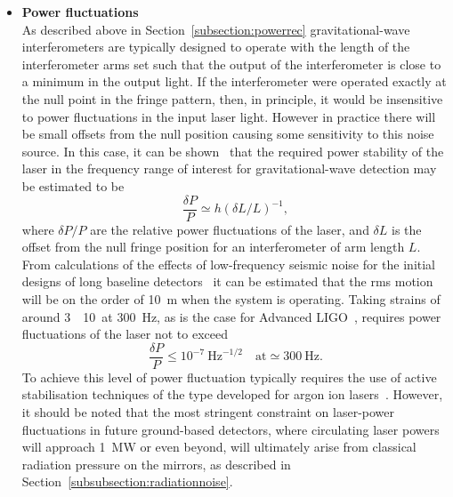 \begin{itemize}
\item \textbf{Power fluctuations} \\
As described above in Section~\ref{subsection:powerrec} gravitational-wave
interferometers are typically designed to operate with the length of the
interferometer arms set such that the output of the interferometer is close to a
minimum in the output light. If the interferometer were operated exactly at the
null point in the fringe pattern, then, in principle, it would be insensitive to
power fluctuations in the input laser light. However in practice there will be
small offsets from the null position causing some sensitivity to this noise
source.  In this case, it can be shown~\cite{Hough} that the required power
stability of the laser in the frequency range of interest for gravitational-wave
detection may be estimated to be
%
\begin{equation}
  \frac{\delta P}{P} \simeq h (\delta L/L)^{-1},
  \label{equation:intnoise1}
\end{equation}
%
where $\delta P/P$ are the relative power fluctuations of the laser, and $\delta
L$ is the offset from the null fringe position for an interferometer of arm
length $L$.  From calculations of the effects of low-frequency seismic noise for
the initial designs of long baseline detectors~\cite{Hough} it can be estimated
that the rms motion will be on the order of 10~m when the system is
operating. Taking strains of around 3~\texttimes~10~\Hz at
300~Hz, as is the case for Advanced LIGO~\cite{Harry:2010}, requires
power fluctuations of the laser not to exceed
%
\begin{equation}
  \frac{\delta P}{P} \leq 10^{-7} \mathrm{\ Hz}^{-1/2} \quad \mathrm{at}
  \simeq 300 \mathrm{\ Hz}.
  \label{equation:intnoise2}
\end{equation}
%
To achieve this level of power fluctuation typically requires the use of active
stabilisation techniques of the type developed for argon ion
lasers~\cite{Mangan}.
%
However, it should be noted that the most stringent constraint on laser-power fluctuations
in future ground-based detectors, where circulating laser powers will approach 1~MW or even beyond,
will ultimately arise from classical radiation pressure on the mirrors, as described in
Section~\ref{subsubsection:radiationnoise}.


\end{itemize}
